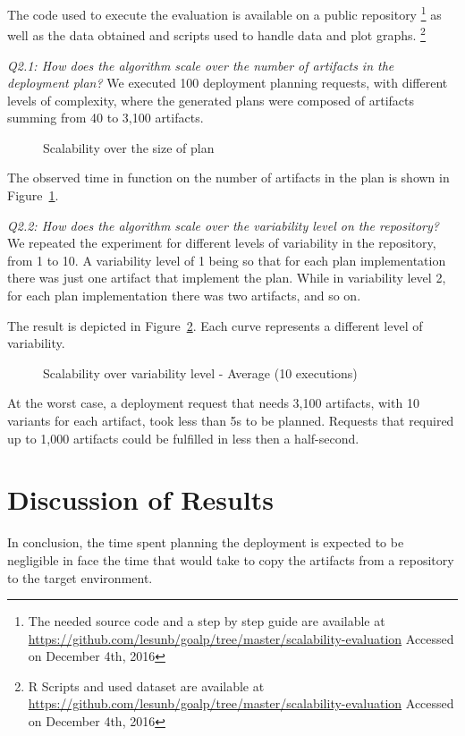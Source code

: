 The code used to execute the evaluation is available on a public repository
\footnote{The needed source code and a step by step guide are available at
\url{https://github.com/lesunb/goalp/tree/master/scalability-evaluation} Accessed on December 4th, 2016}
as well as
the data obtained and scripts used to handle data and plot graphs.
\footnote{R Scripts\cite{the_r_foundation_r_2016} and used dataset are available at
\url{https://github.com/lesunb/goalp/tree/master/scalability-evaluation} Accessed on December 4th, 2016}

\emph{Q2.1: How does the algorithm scale over the number of artifacts in the deployment plan?} We executed 100 deployment planning requests, with different levels of complexity, where the generated plans were composed of artifacts summing from 40 to 3,100 artifacts.

\begin{figure}[!htb]
  \centering
  \caption{Scalability over the size of plan}
\label{graph_plan_size_and_time}
\end{figure}

The observed time in function on the number of artifacts in the plan is shown in Figure~\ref{graph_plan_size_and_time}.

\emph{Q2.2:  How does the algorithm scale over the variability level on the repository?}
We repeated the experiment for different levels of variability in the repository, from 1 to 10. A variability level of 1 being so that for each plan implementation there was just one artifact that implement the plan. While in variability level 2, for each plan implementation there was two artifacts, and so on.

The result is depicted in Figure~\ref{graph_scalability}. Each curve represents a different level of variability.

\begin{figure}[!htb]
  \centering
  \caption{Scalability over variability level - Average (10 executions)}
\label{graph_scalability}
\end{figure}

At the worst case, a deployment request that needs 3,100 artifacts, with 10 variants for each artifact, took less than 5s to be planned. Requests that required up to 1,000 artifacts could be fulfilled in less then a half-second.

\section{Discussion of Results}

In conclusion, the time spent planning the deployment is expected to be negligible in face the time that would take to copy the artifacts from a repository to the target environment.


